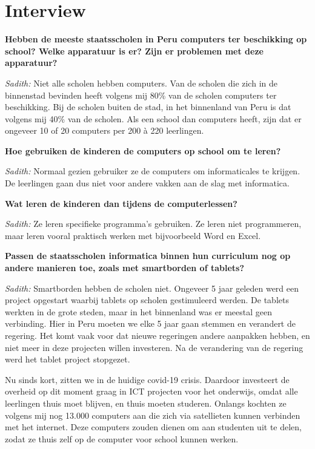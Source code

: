 \section{Interview}
\textbf{Hebben de meeste staatsscholen in Peru computers ter beschikking op school? Welke apparatuur is er? Zijn er problemen met deze apparatuur?}

\textit{Sadith:} Niet alle scholen hebben computers. Van de scholen die zich in de binnenstad bevinden heeft volgens mij 80\% van de scholen computers ter beschikking. Bij de scholen buiten de stad, in het binnenland van Peru is dat volgens mij 40\% van de scholen. Als een school dan computers heeft, zijn dat er ongeveer 10 of 20 computers per 200 à 220 leerlingen.

\textbf{Hoe gebruiken de kinderen de computers op school om te leren?}

\textit{Sadith:} Normaal gezien gebruiker ze de computers om informaticales te krijgen. De leerlingen gaan dus niet voor andere vakken aan de slag met informatica. 

\textbf{Wat leren de kinderen dan tijdens de computerlessen?}

\textit{Sadith:} Ze leren specifieke programma's gebruiken. Ze leren niet programmeren, maar leren vooral praktisch werken met bijvoorbeeld Word en Excel.

\textbf{Passen de staatsscholen informatica binnen hun curriculum nog op andere manieren toe, zoals met smartborden of tablets?}

\textit{Sadith:} Smartborden hebben de scholen niet. Ongeveer 5 jaar geleden werd een project opgestart waarbij tablets op scholen gestimuleerd werden. De tablets werkten in de grote steden, maar in het binnenland was er meestal geen verbinding. Hier in Peru moeten we elke 5 jaar gaan stemmen en verandert de regering. Het komt vaak voor dat nieuwe regeringen andere aanpakken hebben, en niet meer in deze projecten willen investeren. Na de verandering van de regering werd het tablet project stopgezet.

Nu sinds kort, zitten we in de huidige covid-19 crisis. Daardoor investeert de overheid op dit moment graag in ICT projecten voor het onderwijs, omdat alle leerlingen thuis moet blijven, en thuis moeten studeren. Onlangs kochten ze volgens mij nog 13.000 computers aan die zich via satellieten kunnen verbinden met het internet. Deze computers zouden dienen om aan studenten uit te delen, zodat ze thuis zelf op de computer voor school kunnen werken. 

